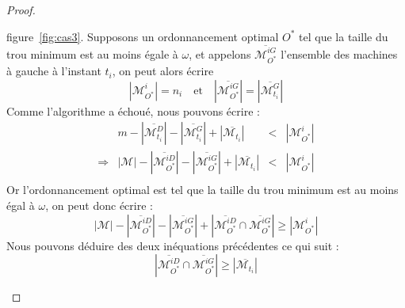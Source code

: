 \documentclass[a4paper,9pt]{article}
\begin{document}
\begin{proof}
\begin{bitemize}
\begin{enumerate}
                    figure~\ref{fig:cas3}. 
                    Supposons un ordonnancement optimal $O^*$ tel que la taille du trou minimum est
                    au moins égale à $\omega$, et appelons
                    $\overline{\mathcal{M}_{O^*}^{iG}}$ l'ensemble des machines 
                    à gauche à l'instant $t_i$, on peut alors écrire
                    \begin{displaymath}
                        |\mathcal{M}_{O^*}^i| = n_i \quad \mbox{et} \quad
                        |\overline{\mathcal{M}_{O^*}^{iG}}| = |\overline{\mathcal{M}_{t_i}^{G}}|
                    \end{displaymath} 
                    Comme l'algorithme a échoué, nous pouvons écrire :
                    \begin{displaymath}
                        \begin{array}{rrcl}
                            & m - |\overline{\mathcal{M}_{t_i}^D}| -
                            |\overline{\mathcal{M}_{t_i}^G}| + |\overline{\mathcal{M}_{t_i}}| & < &
                            |\mathcal{M}_{O^*}^i| \\
                            \Rightarrow & |\mathcal{M}| - |\overline{\mathcal{M}_{O^*}^{iD}}| -
                            |\overline{\mathcal{M}_{O^*}^{iG}}| + |\overline{\mathcal{M}_{t_i}}| & <
                            & |\mathcal{M}_{O^*}^i| \\
                        \end{array}
                    \end{displaymath}
                    Or l'ordonnancement optimal est tel que la taille du trou minimum est au moins
                    égal à $\omega$, on peut donc écrire :
                    \begin{displaymath}
                        |\mathcal{M}| - |\overline{\mathcal{M}_{O^*}^{iD}}| -
                        |\overline{\mathcal{M}_{O^*}^{iG}}| + |\overline{\mathcal{M}_{O^*}^{iD}}
                        \cap \overline{\mathcal{M}_{O^*}^{iG}}|\geq |\mathcal{M}_{O^*}^i|
                    \end{displaymath}
                    Nous pouvons déduire des deux inéquations précédentes ce qui suit :
                    \begin{displaymath}
                        |\overline{\mathcal{M}_{O^*}^{iD}} \cap \overline{\mathcal{M}_{O^*}^{iG}}|
                        \geq |\overline{\mathcal{M}_{t_i}}|
                    \end{displaymath}

\end{enumerate}
\end{bitemize}
\end{proof}
\end{document}

